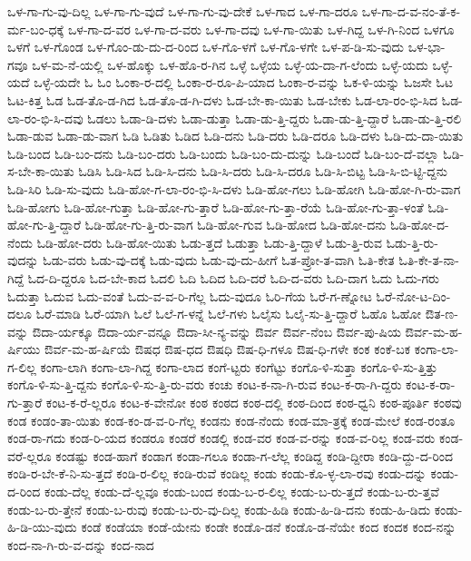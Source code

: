 {ಒಳ-ಗಾ-ಗು-ವು-ದಿಲ್ಲ
ಒಳ-ಗಾ-ಗು-ವುದೆ
ಒಳ-ಗಾ-ಗು-ವು-ದೇಕೆ
ಒಳ-ಗಾದ
ಒಳ-ಗಾ-ದರೂ
ಒಳ-ಗಾ-ದ-ವ-ನಂ-ತೆ-ಕ-ರ್ಮ-ಬಂ-ಧಕ್ಕೆ
ಒಳ-ಗಾ-ದ-ವರ
ಒಳ-ಗಾ-ದ-ವರು
ಒಳ-ಗಾ-ದವು
ಒಳ-ಗಾ-ಯಿತು
ಒಳ-ಗಿದ್ದ
ಒಳ-ಗಿ-ನಿಂದ
ಒಳಗೂ
ಒಳಗೆ
ಒಳ-ಗೊಂಡ
ಒಳ-ಗೊಂ-ಡು-ದು-ದ-ರಿಂದ
ಒಳ-ಗೊ-ಳಗೆ
ಒಳ-ಗೊ-ಳಗೇ
ಒಳ-ಪ-ಡಿ-ಸು-ವುದು
ಒಳ-ಭಾ-ಗವೂ
ಒಳ-ಮ-ನೆ-ಯಲ್ಲಿ
ಒಳ-ಹೊಕ್ಕು
ಒಳ-ಹೊ-ರ-ಗಿನ
ಒಳ್ಳೆ
ಒಳ್ಳೆಯ
ಒಳ್ಳೆ-ಯ-ದಾ-ಗ-ಲೆಂದು
ಒಳ್ಳೆ-ಯದು
ಒಳ್ಳೆ-ಯದೆ
ಒಳ್ಳೆ-ಯದೇ
ಓ
ಓಂ
ಓಂಕಾ-ರ-ದಲ್ಲಿ
ಓಂಕಾ-ರ-ರೂ-ಪಿ-ಯಾದ
ಓಂಕಾ-ರ-ವನ್ನು
ಓಕ-ಳಿ-ಯನ್ನು
ಓಜಸೇ
ಓಟ
ಓಟ-ಕಿತ್ತ
ಓಡ
ಓಡ-ತೊ-ಡ-ಗಿದ
ಓಡ-ತೊ-ಡ-ಗಿ-ದಳು
ಓಡ-ಬೇ-ಕಾ-ಯಿತು
ಓಡ-ಬೇಕು
ಓಡ-ಲಾ-ರಂ-ಭಿ-ಸಿದ
ಓಡ-ಲಾ-ರಂ-ಭಿ-ಸಿ-ದವು
ಓಡಲು
ಓಡಾ-ಡಿ-ದಳು
ಓಡಾ-ಡುತ್ತಾ
ಓಡಾ-ಡು-ತ್ತಿ-ದ್ದರು
ಓಡಾ-ಡು-ತ್ತಿ-ದ್ದಾರೆ
ಓಡಾ-ಡು-ತ್ತಿ-ರಲಿ
ಓಡಾ-ಡುವ
ಓಡಾ-ಡು-ವಾಗ
ಓಡಿ
ಓಡಿತು
ಓಡಿದ
ಓಡಿ-ದನು
ಓಡಿ-ದರು
ಓಡಿ-ದರೂ
ಓಡಿ-ದಳು
ಓಡಿ-ದು-ದಾ-ಯಿತು
ಓಡಿ-ಬಂದ
ಓಡಿ-ಬಂ-ದನು
ಓಡಿ-ಬಂ-ದರು
ಓಡಿ-ಬಂದು
ಓಡಿ-ಬಂ-ದು-ದುನ್ನು
ಓಡಿ-ಬಂದೆ
ಓಡಿ-ಬಂ-ದೆ-ವಲ್ಲಾ
ಓಡಿ-ಸ-ಬೇ-ಕಾ-ಯಿತು
ಓಡಿಸಿ
ಓಡಿ-ಸಿದ
ಓಡಿ-ಸಿ-ದನು
ಓಡಿ-ಸಿ-ದರು
ಓಡಿ-ಸಿ-ದರೂ
ಓಡಿ-ಸಿ-ಬಿಟ್ಟ
ಓಡಿ-ಸಿ-ಬಿ-ಟ್ಟಿ-ದ್ದನು
ಓಡಿ-ಸಿರಿ
ಓಡಿ-ಸು-ವುದು
ಓಡಿ-ಹೋ-ಗ-ಲಾ-ರಂ-ಭಿ-ಸಿ-ದಳು
ಓಡಿ-ಹೋ-ಗಲು
ಓಡಿ-ಹೋಗಿ
ಓಡಿ-ಹೋ-ಗಿ-ರು-ವಾಗ
ಓಡಿ-ಹೋಗು
ಓಡಿ-ಹೋ-ಗುತ್ತಾ
ಓಡಿ-ಹೋ-ಗು-ತ್ತಾರೆ
ಓಡಿ-ಹೋ-ಗು-ತ್ತಾ-ರೆಯೆ
ಓಡಿ-ಹೋ-ಗು-ತ್ತಾ-ಳಂತೆ
ಓಡಿ-ಹೋ-ಗು-ತ್ತಿ-ದ್ದಾರೆ
ಓಡಿ-ಹೋ-ಗು-ತ್ತಿ-ರು-ವಾಗ
ಓಡಿ-ಹೋ-ಗುವ
ಓಡಿ-ಹೋದ
ಓಡಿ-ಹೋ-ದನು
ಓಡಿ-ಹೋ-ದ-ನೆಂದು
ಓಡಿ-ಹೋ-ದರು
ಓಡಿ-ಹೋ-ಯಿತು
ಓಡು-ತ್ತದೆ
ಓಡುತ್ತಾ
ಓಡು-ತ್ತಿ-ದ್ದಾಳೆ
ಓಡು-ತ್ತಿ-ರುವ
ಓಡು-ತ್ತಿ-ರು-ವುದನ್ನು
ಓಡು-ವರು
ಓಡು-ವು-ದಕ್ಕೆ
ಓಡು-ವುದು
ಓಡು-ವು-ದು-ಹೀಗೆ
ಓತ-ಪ್ರೋ-ತ-ವಾಗಿ
ಓತಿ-ಕೇತ
ಓತಿ-ಕೇ-ತ-ನಾ-ಗಿದ್ದೆ
ಓದ-ದಿ-ದ್ದರೂ
ಓದ-ಬೇ-ಕಾದ
ಓದಲಿ
ಓದಿ
ಓದಿದ
ಓದಿ-ದರೆ
ಓದಿ-ದ-ವರು
ಓದಿ-ದಾಗ
ಓದು
ಓದು-ಗರು
ಓದುತ್ತಾ
ಓದುವ
ಓದು-ವಂತೆ
ಓದು-ವ-ವ-ರಿ-ಗೆಲ್ಲ
ಓದು-ವುದೂ
ಓರಿ-ಗೆಯ
ಓರೆ-ಗ-ಣ್ನೋಟ
ಓರೆ-ನೋ-ಟ-ದಿಂ-ದಲೂ
ಓರೆ-ಮಾಡಿ
ಓರೆ-ಯಾಗಿ
ಓಲೆ
ಓಲೆ-ಗ-ಳನ್ನೆ
ಓಲೆ-ಗಳು
ಓಲೈಸು
ಓಲೈ-ಸು-ತ್ತಿ-ದ್ದಾರೆ
ಓಹೊ
ಓಹೋ
ಔತ-ಣ-ವನ್ನು
ಔದಾ-ರ್ಯಕ್ಕೂ
ಔದಾ-ರ್ಯ-ವನ್ನೂ
ಔದಾ-ಸೀ-ನ್ಯ-ವನ್ನು
ಔರ್ವ
ಔರ್ವ-ನೆಂಬ
ಔರ್ವ-ಪು-ಷಿಯ
ಔರ್ವ-ಮ-ಹ-ರ್ಷಿಯು
ಔರ್ವ-ಮ-ಹ-ರ್ಷಿಯೆ
ಔಷಧ
ಔಷ-ಧದ
ಔಷಧಿ
ಔಷ-ಧಿ-ಗಳೂ
ಔಷ-ಧಿ-ಗಳೇ
ಕಂಕ
ಕಂಕೆ-ಬಕ
ಕಂಗಾ-ಲಾ-ಗ-ಲಿಲ್ಲ
ಕಂಗಾ-ಲಾಗಿ
ಕಂಗಾ-ಲಾ-ಗಿದ್ದ
ಕಂಗಾ-ಲಾದ
ಕಂಗೆ-ಟ್ಟರು
ಕಂಗೆಟ್ಟು
ಕಂಗೊ-ಳಿ-ಸುತ್ತಾ
ಕಂಗೊ-ಳಿ-ಸು-ತ್ತಿತ್ತು
ಕಂಗೊ-ಳಿ-ಸು-ತ್ತಿ-ದ್ದನು
ಕಂಗೊ-ಳಿ-ಸು-ತ್ತಿ-ರು-ವರು
ಕಂಚು
ಕಂಟ-ಕ-ನಾ-ಗಿ-ರುವ
ಕಂಟ-ಕ-ರಾ-ಗಿ-ದ್ದರು
ಕಂಟ-ಕ-ರಾ-ಗು-ತ್ತಾರೆ
ಕಂಟ-ಕ-ರೆ-ಲ್ಲರೂ
ಕಂಟ-ಕ-ವೇನೋ
ಕಂಠ
ಕಂಠದ
ಕಂಠ-ದಲ್ಲಿ
ಕಂಠ-ದಿಂದ
ಕಂಠ-ಧ್ವನಿ
ಕಂಠ-ಪೂರ್ತಿ
ಕಂಠವು
ಕಂಡ
ಕಂಡಂ-ತಾ-ಯಿತು
ಕಂಡ-ಕಂ-ಡ-ವ-ರಿ-ಗೆಲ್ಲ
ಕಂಡನು
ಕಂಡ-ನೆಂದು
ಕಂಡ-ಮಾ-ತ್ರಕ್ಕೆ
ಕಂಡ-ಮೇಲೆ
ಕಂಡ-ರಂತೂ
ಕಂಡ-ರಾ-ಗದು
ಕಂಡ-ರಿ-ಯದ
ಕಂಡರೂ
ಕಂಡರೆ
ಕಂಡಲ್ಲಿ
ಕಂಡ-ವರ
ಕಂಡ-ವ-ರನ್ನು
ಕಂಡ-ವ-ರಿಲ್ಲ
ಕಂಡ-ವರು
ಕಂಡ-ವರೆ-ಲ್ಲರೂ
ಕಂಡಷ್ಟು
ಕಂಡ-ಹಾಗೆ
ಕಂಡಾಗ
ಕಂಡಾ-ಗಲೂ
ಕಂಡಾ-ಗ-ಲೆಲ್ಲ
ಕಂಡಿದ್ದ
ಕಂಡಿ-ದ್ದೀರಾ
ಕಂಡಿ-ದ್ದು-ದ-ರಿಂದ
ಕಂಡಿ-ರ-ಬೇ-ಕೆ-ನಿ-ಸು-ತ್ತದೆ
ಕಂಡಿ-ರ-ಲಿಲ್ಲ
ಕಂಡಿ-ರುವೆ
ಕಂಡಿಲ್ಲ
ಕಂಡು
ಕಂಡು-ಕೊ-ಳ್ಳ-ಲಾ-ರವು
ಕಂಡು-ದನ್ನು
ಕಂಡು-ದ-ರಿಂದ
ಕಂಡು-ದೆಲ್ಲ
ಕಂಡು-ದೆ-ಲ್ಲವೂ
ಕಂಡು-ಬಂದ
ಕಂಡು-ಬ-ರ-ಲಿಲ್ಲ
ಕಂಡು-ಬ-ರು-ತ್ತದೆ
ಕಂಡು-ಬ-ರು-ತ್ತವೆ
ಕಂಡು-ಬ-ರು-ತ್ತೇನೆ
ಕಂಡು-ಬ-ರುವು
ಕಂಡು-ಬ-ರು-ವು-ದಿಲ್ಲ
ಕಂಡು-ಹಿಡಿ
ಕಂಡು-ಹಿ-ಡಿ-ದನು
ಕಂಡು-ಹಿ-ಡಿದು
ಕಂಡು-ಹಿ-ಡಿ-ಯು-ವುದು
ಕಂಡೆ
ಕಂಡೆಯಾ
ಕಂಡೆ-ಯೇನು
ಕಂಡೇ
ಕಂಡೊ-ಡನೆ
ಕಂಡೊ-ಡ-ನೆಯೇ
ಕಂದ
ಕಂದಕ
ಕಂದ-ನನ್ನು
ಕಂದ-ನಾ-ಗಿ-ರು-ವ-ದನ್ನು
ಕಂದ-ನಾದ
}
